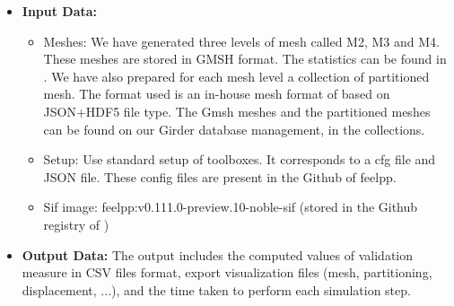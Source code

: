 \begin{itemize}
\item \textbf{Input Data:}
  \begin{itemize}
  \item Meshes: We have generated three levels of mesh called M2, M3
    and M4. These meshes are stored in GMSH format. The statistics can be found in
    . We have also prepared for
    each mesh level a collection of partitioned mesh.
    The format used is an in-house mesh format of \Feelpp based on
    JSON+HDF5 file type.
    The Gmsh meshes and the partitioned meshes can be found on our Girder
    database management, in the \Feelpp collections.
  \item Setup: Use standard setup of \Feelpp toolboxes. It corresponds to a cfg
    file and JSON file. These config files are present in the Github of feelpp.
  \item Sif image: feelpp:v0.111.0-preview.10-noble-sif  (stored in the Github registry of \Feelpp)
  \end{itemize}
\item \textbf{Output Data:} The output includes the computed values of
  validation measure in CSV files format, export visualization files (mesh,
  partitioning, displacement, ...), and the time taken to perform each simulation step.
\end{itemize}

